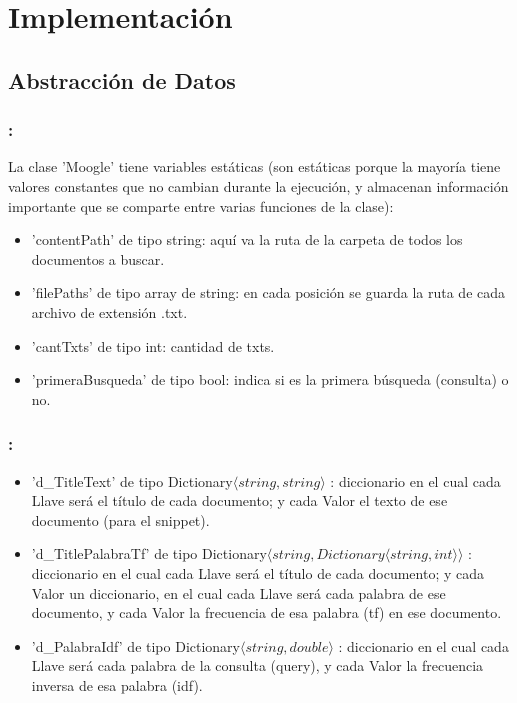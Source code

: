 \documentclass{beamer}
\begin{document}
\section{Implementación}\label{sec:impl}   
\subsection{Abstracción de Datos}\label{sub:abstDat}
\begin{frame}
  \frametitle{\Large \insertsection : \insertsubsection} 
  La clase 'Moogle' tiene variables estáticas (son estáticas porque la mayoría tiene valores constantes que no cambian 
  durante la ejecución, y almacenan información importante que se comparte entre varias funciones de la clase):
   \begin{itemize}
    \item 'contentPath' de tipo string: aquí va la ruta de la carpeta de todos los documentos a buscar.
    \item 'filePaths' de tipo array de string: en cada posición se guarda la ruta de cada archivo de extensión .txt.
    \item 'cantTxts' de tipo int: cantidad de txts.
    \item 'primeraBusqueda' de tipo bool: indica si es la primera búsqueda (consulta) o no.
  \end{itemize}
\end{frame}    
\begin{frame}
  \frametitle{\Large \insertsection : \insertsubsection} 
   \begin{itemize}
    \item 'd\_TitleText' de tipo Dictionary$\langle string, string\rangle$ : diccionario en el cual cada Llave será el título de cada 
    documento; y cada Valor el texto de ese documento (para el snippet).
    \pause
   \item 'd\_TitlePalabraTf' de tipo Dictionary$\langle string, Dictionary\langle string,int\rangle \rangle$ : diccionario en el cual cada 
   Llave será el título de cada documento; y cada Valor un diccionario, en el cual cada Llave será cada palabra de ese documento,
    y cada Valor la frecuencia de esa palabra (tf) en ese documento.
    \pause
   \item 'd\_PalabraIdf' de tipo Dictionary$\langle string, double\rangle$ : diccionario en el cual cada Llave será cada palabra de la 
   consulta (query), y cada Valor la frecuencia inversa de esa palabra (idf).
  \end{itemize}
\end{frame}  
\end{document}
